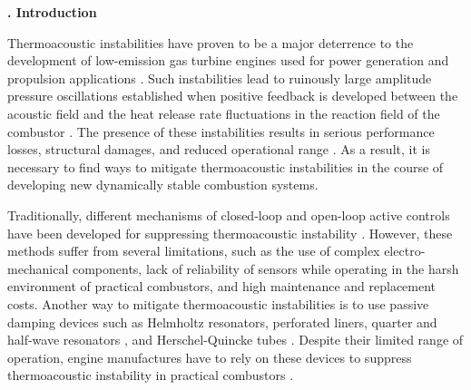 \documentclass[twocolumn,10pt]{article} %
\renewcommand{\section}%
              [1]%
              {%
               \bgroup%
               \flushleft%
               \small\bf%
               \stepcounter{section}%
               \arabic{section}. #1%
               \par%
               \egroup%
              }%
\begin{document}

\clearpage

\section{Introduction} \addvspace{10pt}

Thermoacoustic instabilities have proven to be a major deterrence to the development of low-emission gas turbine engines used for power generation and propulsion applications \cite{lieuwen2005combustion}. Such instabilities lead to ruinously large amplitude pressure oscillations established when positive feedback is developed between the acoustic field and the heat release rate fluctuations in the reaction field of the combustor \cite{sujith2021thermoacoustic}. The presence of these instabilities results in serious performance losses, structural damages, and reduced operational range \cite{culick2006unsteady}. As a result, it is necessary to find ways to mitigate thermoacoustic instabilities in the course of developing new dynamically stable combustion systems.

Traditionally, different mechanisms of closed-loop and open-loop active controls have been developed for  suppressing thermoacoustic instability \cite{dowling2005feedback}. However, these methods suffer from several limitations, such as the use of complex electro-mechanical components, lack of reliability of sensors while operating in the harsh environment of practical combustors, and high maintenance and replacement costs. Another way to mitigate thermoacoustic instabilities is to use passive damping devices such as Helmholtz resonators, perforated liners, quarter and half-wave resonators \cite{zhao2015review}, and Herschel-Quincke tubes \cite{park2008thermo, rajaram2012attenuation}. Despite their limited range of operation, engine manufactures have to rely on these devices to suppress thermoacoustic instability in practical combustors \cite{lieuwen2005combustion}.%
\end{document}
